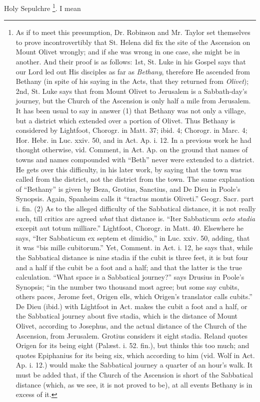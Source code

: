 Holy Sepulchre \footnote{As if to meet this presumption, Dr. Robinson and Mr. Taylor set
themselves to prove incontrovertibly that St. Helena did fix the site
of the Ascension on Mount Olivet wrongly; and if she was wrong in one
case, she might be in another. And their proof is as follows: 1st, St.
Luke in his Gospel says that our Lord led out His disciples as far as \emph{Bethany},
therefore He ascended from Bethany (in spite of his saying in the
Acts, that they returned from \emph{Olivet}); 2nd, St. Luke says that
from Mount Olivet to Jerusalem is a Sabbath-day's journey, but the
Church of the Ascension is only half a mile from Jerusalem. It has
been usual to say in answer (1) that Bethany was not only a village,
but a district which extended over a portion of Olivet. Thus Bethany
is considered by Lightfoot, Chorogr. in Matt. 37; ibid. 4; Chorogr. in
Marc. 4; Hor. Hebr. in Luc. xxiv. 50, and in Act. Ap. i. 12. In a
previous work he had thought otherwise, vid. Comment, in Act. Ap. on
the ground that names of towns and names compounded with ``Beth''
never were extended to a district. He gets over this difficulty, in
his later work, by saying that the town was called from the district,
not the district from the town. The same explanation of ``Bethany'' is
given by Beza, Grotius, Sanctius, and De Dieu in Poole's Synopsis.
Again, Spanheim calls it ``tractus montis Oliveti.'' Geogr. Sacr. part i.
fin. (2) As to the alleged difficulty of the Sabbatical distance, it
is not really such, till critics are agreed \emph{what} that distance
is. ``Iter Sabbaticum \emph{octo stadia} excepit aut totum milliare.''
Lightfoot, Chorogr. in Matt. 40. Elsewhere he says, ``Iter Sabbaticum
ex septem et dimidio,'' in Luc. xxiv. 50, adding, that it was ``bis
mille cubitorum.'' Yet, Comment. in Act. i. 12, he says that, while the
Sabbatical distance is nine stadia if the cubit is three feet, it is
but four and a half if the cubit be a foot and a half; and that the
latter is the true calculation. ``What space is a Sabbatical journey?''
says Drusius in Poole's Synopsis; ``in the number two thousand most
agree; but some say cubits, others paces, Jerome feet, Origen ells,
which Origen's translator calls cubits.'' De Dieu (ibid.) with
Lightfoot in Act. makes the cubit a foot and a half, or the Sabbatical
journey about five stadia, which is the distance of Mount Olivet,
according to Josephus, and the actual distance of the Church of the
Ascension, from Jerusalem. Grotius considers it eight stadia. Reland
quotes Origen for its being eight (Palæst. i. 52. fin.), but thinks
this too much; and quotes Epiphanius for its being six, which
according to him (vid. Wolf in Act. Ap. i. 12.) would make the
Sabbatical journey a quarter of an hour's walk. It must be added that,
if the Church of the Ascension is short of the Sabbatical distance
(which, as we see, it is not proved to be), at all events Bethany is
in excess of it.}. I mean
